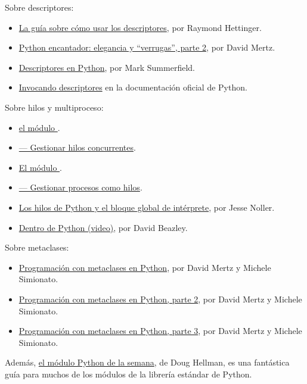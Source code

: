 Sobre descriptores:

\begin{itemize}
  \item \href{http://users.rcn.com/python/download/Descriptor.htm}{La guía sobre cómo usar los descriptores}, por Raymond Hettinger.
  \item \href{http://www.ibm.com/developerworks/linux/library/l-python-elegance-2.html}{Python encantador: elegancia y ``verrugas'', parte 2}, por David Mertz.
  \item \href{http://www.informit.com/articles/printerfriendly.aspx?p=1309289}{Descriptores en Python}, por Mark Summerfield.
  \item \href{http://docs.python.org/3.1/reference/datamodel.html#invoking-descriptors}{Invocando descriptores} en la documentación oficial de Python.
\end{itemize}

Sobre hilos y multiproceso:

\begin{itemize}
  \item \href{http://docs.python.org/3.1/library/threading.html}{el módulo }.
  \item \href{http://www.doughellmann.com/PyMOTW/threading/}{ --- Gestionar hilos concurrentes}.
  \item \href{http://docs.python.org/3.1/library/multiprocessing.html}{El módulo }.
  \item \href{http://www.doughellmann.com/PyMOTW/multiprocessing/}{ --- Gestionar procesos como hilos}.
  \item \href{http://jessenoller.com/2009/02/01/python-threads-and-the-global-interpreter-lock/}{Los hilos de Python y el bloque global de intérprete}, por Jesse Noller.
  \item \href{http://blip.tv/file/2232410}{Dentro de Python (video)}, por David Beazley.
\end{itemize}

Sobre metaclases:

\begin{itemize}
  \item \href{http://gnosis.cx/publish/programming/metaclass_1.html}{Programación con metaclases en Python}, por David Mertz y Michele Simionato.
  \item \href{http://www.phyast.pitt.edu/~micheles/python/meta2.html}{Programación con metaclases en Python, parte 2}, por David Mertz y Michele Simionato.
  \item \href{http://www.ibm.com/developerworks/library/l-pymeta3/}{Programación con metaclases en Python, parte 3}, por David Mertz y Michele Simionato.
\end{itemize}

Además, \href{https://pymotw.com/2/contents.html}{el módulo Python de la semana}, de Doug Hellman, es una fantástica guía para muchos de los módulos de la librería estándar de Python.
